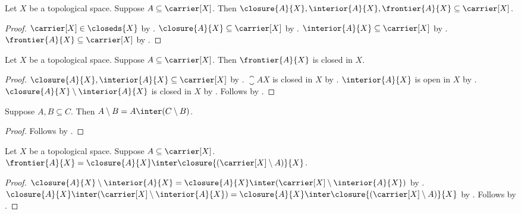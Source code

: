 \begin{proposition}\label{closure_interior_frontier_is_in_carrier}
    Let $X$ be a topological space.
    Suppose $A \subseteq \carrier[X]$.
    Then $\closure{A}{X}, \interior{A}{X}, \frontier{A}{X} \subseteq \carrier[X]$.
\end{proposition}
\begin{proof}
    $\carrier[X]\in\closeds{X}$
        by .
    $\closure{A}{X}\subseteq\carrier[X]$
        by .
    $\interior{A}{X}\subseteq\carrier[X]$
        by .
    $\frontier{A}{X}\subseteq\carrier[X]$
        by .
\end{proof}

\begin{proposition}\label{frontier_is_closed}
    Let $X$ be a topological space.
    Suppose $A \subseteq \carrier[X]$.
    Then $\frontier{A}{X}$ is closed in $X$.
\end{proposition}
\begin{proof}
    $\closure{A}{X},\interior{A}{X}\subseteq\carrier[X]$
        by .
    $\closure{A}{X}$ is closed in $X$ by .
    $\interior{A}{X}$ is open in $X$ by .
    $\closure{A}{X}\setminus\interior{A}{X}$ is closed in $X$
        by .
    Follows by .
\end{proof}

\begin{proposition}\label{setdifference_eq_intersection_with_complement}
    Suppose $A,B \subseteq C$.
    Then $A \setminus B = A \inter (C \setminus B)$.
\end{proposition}
\begin{proof}
    Follows by .
\end{proof}



\begin{proposition}\label{frontier_as_inter}
    Let $X$ be a topological space.
    Suppose $A \subseteq \carrier[X]$.
    $\frontier{A}{X} = \closure{A}{X} \inter \closure{(\carrier[X]\setminus A)}{X}$.
\end{proposition}
\begin{proof}
    $\closure{A}{X}\setminus\interior{A}{X}
        =\closure{A}{X}\inter(\carrier[X]\setminus\interior{A}{X})$
        by .
    $\closure{A}{X}\inter(\carrier[X]\setminus\interior{A}{X})
        =\closure{A}{X}\inter\closure{(\carrier[X]\setminus A)}{X}$
        by .
    Follows by .
\end{proof}

